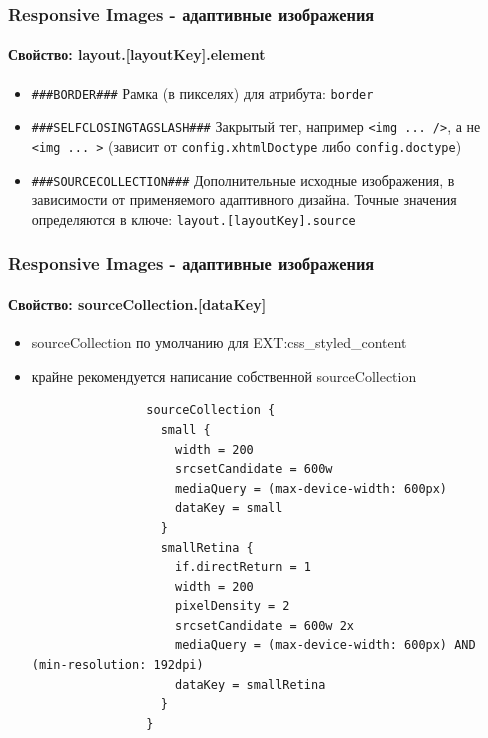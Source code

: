 \begin{frame}[fragile]
	\frametitle{Responsive Images - адаптивные изображения}
	\framesubtitle{Свойство: layout.[layoutKey].element}

		\begin{itemize}
			\item \lstinline!###BORDER###!\newline
				Рамка (в пикселях) для атрибута: \texttt{border}

			\item \lstinline!###SELFCLOSINGTAGSLASH###!\newline
				Закрытый тег, например \texttt{<img ... />}, а не \texttt{<img ... >}\newline
				(зависит от \texttt{config.xhtmlDoctype} либо \texttt{config.doctype})

			\item \lstinline!###SOURCECOLLECTION###!\newline
				Дополнительные исходные изображения, в зависимости от применяемого адаптивного дизайна.
				Точные значения определяются в ключе: \texttt{layout.[layoutKey].source}

	\end{itemize}

\end{frame}


\begin{frame}[fragile]
	\frametitle{Responsive Images - адаптивные изображения}
	\framesubtitle{Свойство: sourceCollection.[dataKey]}

	\begin{itemize}
		\item sourceCollection по умолчанию для EXT:css\_styled\_content
		\item крайне рекомендуется написание собственной sourceCollection

			\lstset{
				basicstyle=\tiny\ttfamily
			}

			\begin{lstlisting}
				sourceCollection {
				  small {
				    width = 200
				    srcsetCandidate = 600w
				    mediaQuery = (max-device-width: 600px)
				    dataKey = small
				  }
				  smallRetina {
				    if.directReturn = 1
				    width = 200
				    pixelDensity = 2
				    srcsetCandidate = 600w 2x
				    mediaQuery = (max-device-width: 600px) AND (min-resolution: 192dpi)
				    dataKey = smallRetina
				  }
				}
			\end{lstlisting}
	\end{itemize}

\end{frame}

